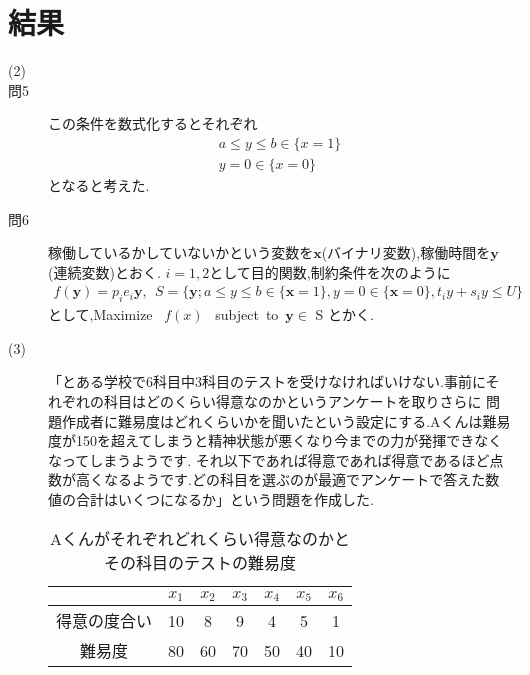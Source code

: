 \documentclass[12pt]{jarticle}
\begin{document}


\section{結果}
\begin{description}
	\item[(2)]
	\item[問5]
	      この条件を数式化するとそれぞれ
	      \begin{eqnarray}
		      a\leq y\leq b \in \{x=1\}\nonumber\\
		      y=0\in \{x=0\}\nonumber
	      \end{eqnarray}
	      となると考えた. 
	\item[問6]
	      稼働しているかしていないかという変数を$\boldsymbol{x}$(バイナリ変数),稼働時間を$\boldsymbol{y}$(連続変数)とおく.
	      $i=1,2$として目的関数,制約条件を次のように
	      \begin{eqnarray}
		      f(\boldsymbol{y})=p_ie_i\boldsymbol{y},\ \ S=\{\boldsymbol{y};a\leq y\leq b\in \{\boldsymbol{x}=1\},y=0\in \{\boldsymbol{x}=0\},t_iy+s_iy\leq U\}
	      \end{eqnarray}
	      として,Maximize \ $f(x)$ \ subject\ to\ $\boldsymbol{y}\in$ S とかく.
	\item[(3)]
	      「とある学校で6科目中3科目のテストを受けなければいけない.事前にそれぞれの科目はどのくらい得意なのかというアンケートを取りさらに
	      問題作成者に難易度はどれくらいかを聞いたという設定にする.Aくんは難易度が150を超えてしまうと精神状態が悪くなり今までの力が発揮できなくなってしまうようです.
	      それ以下であれば得意であれば得意であるほど点数が高くなるようです.どの科目を選ぶのが最適でアンケートで答えた数値の合計はいくつになるか」という問題を作成した.
	      \begin{table}[h]
		      \caption{Aくんがそれぞれどれくらい得意なのかとその科目のテストの難易度}
		      \begin{center}
			      \begin{tabular}{|c|c|c|c|c|c|c|}
				      \hline
				                   & $x_1$ & $x_2$ & $x_3$ & $x_4$ & $x_5$ & $x_6$ \\
				      \hline
				      得意の度合い & 10    & 8     & 9     & 4     & 5     & 1     \\
				      \hline
				      難易度       & 80    & 60    & 70    & 50    & 40    & 10    \\
				      \hline
			      \end{tabular}

\end{center}
\end{table}
\end{description}
\end{document}
